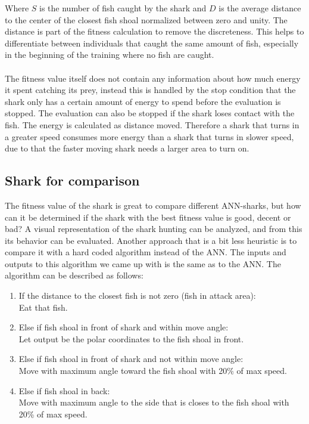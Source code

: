 Where $S$ is the number of fish caught by the shark and $D$ is the average
distance to the center of the closest fish shoal normalized between zero and
unity. The distance is part of the fitness calculation to remove the
discreteness. This helps to differentiate between individuals that caught the
same amount of fish, especially in the beginning of the training where no fish
are caught.\\
\\
The fitness value itself does not contain any information about how much energy
it spent catching its prey, instead this is handled by the stop condition that
the shark only has a certain amount of energy to spend before the evaluation is
stopped. The evaluation can also be stopped if the shark loses contact with the
fish. The energy is calculated as distance moved. Therefore a shark that turns
in a greater speed consumes more energy than a shark that turns in slower speed,
due to that the faster moving shark needs a larger area to turn on.

\subsection{Shark for comparison}
The fitness value of the shark is great to compare different ANN-sharks, but how
can it be determined if the shark with the best fitness value is good, decent or
bad? A visual representation of the shark hunting can be analyzed, and from
this its behavior can be evaluated. Another approach that is a bit less
heuristic is to compare it with a hard coded algorithm instead of the ANN.
The inputs and outputs to this algorithm we came up with is the same as to the
ANN. The algorithm can be described as follows:
\begin{enumerate}
\item If the distance to the closest fish is not zero (fish in attack area):\\
    \hspace*{5pt}Eat that fish.
\item Else if fish shoal in front of shark and within move angle: \\
    \hspace*{5pt}Let output be the polar coordinates to the fish shoal in front.
\item Else if fish shoal in front of shark and not within move angle: \\
    \hspace*{5pt}Move with maximum angle toward the fish shoal with 20\% of max speed.
\item Else if fish shoal in back:\\
    \hspace*{5pt}Move with maximum angle to the side that is closes to the fish
    shoal with 20\% of max speed.
\end{enumerate}

